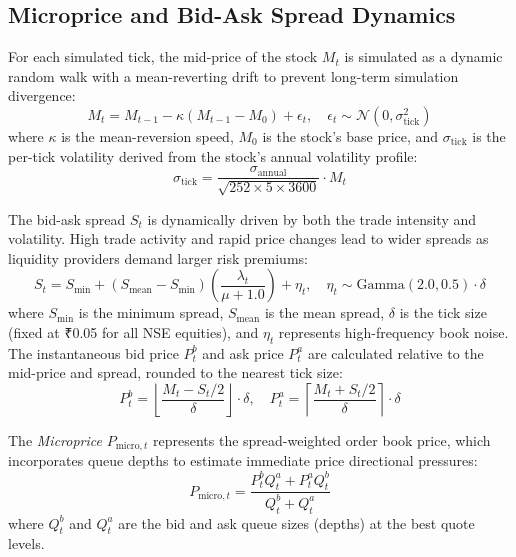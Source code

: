 \documentclass[11pt,a4paper]{article}
\begin{document}
\subsection{Microprice and Bid-Ask Spread Dynamics}
For each simulated tick, the mid-price of the stock $M_t$ is simulated as a dynamic random walk with a mean-reverting drift to prevent long-term simulation divergence:
\begin{equation}
    M_t = M_{t-1} - \kappa (M_{t-1} - M_0) + \epsilon_t, \quad \epsilon_t \sim \mathcal{N}(0, \sigma_{\text{tick}}^2)
\end{equation}
where $\kappa$ is the mean-reversion speed, $M_0$ is the stock's base price, and $\sigma_{\text{tick}}$ is the per-tick volatility derived from the stock's annual volatility profile:
\begin{equation}
    \sigma_{\text{tick}} = \frac{\sigma_{\text{annual}}}{\sqrt{252 \times 5 \times 3600}} \cdot M_t
\end{equation}

The bid-ask spread $S_t$ is dynamically driven by both the trade intensity and volatility. High trade activity and rapid price changes lead to wider spreads as liquidity providers demand larger risk premiums:
\begin{equation}
    S_t = S_{\text{min}} + (S_{\text{mean}} - S_{\text{min}}) \left(\frac{\lambda_t}{\mu + 1.0}\right) + \eta_t, \quad \eta_t \sim \text{Gamma}(2.0, 0.5) \cdot \delta
\end{equation}
where $S_{\text{min}}$ is the minimum spread, $S_{\text{mean}}$ is the mean spread, $\delta$ is the tick size (fixed at ₹0.05 for all NSE equities), and $\eta_t$ represents high-frequency book noise. The instantaneous bid price $P_t^b$ and ask price $P_t^a$ are calculated relative to the mid-price and spread, rounded to the nearest tick size:
\begin{equation}
    P_t^b = \left\lfloor \frac{M_t - S_t/2}{\delta} \right\rfloor \cdot \delta, \quad P_t^a = \left\lceil \frac{M_t + S_t/2}{\delta} \right\rceil \cdot \delta
\end{equation}

The \textit{Microprice} $P_{\text{micro}, t}$ represents the spread-weighted order book price, which incorporates queue depths to estimate immediate price directional pressures:
\begin{equation}
    P_{\text{micro}, t} = \frac{P_t^b Q_t^a + P_t^a Q_t^b}{Q_t^b + Q_t^a}
\end{equation}
where $Q_t^b$ and $Q_t^a$ are the bid and ask queue sizes (depths) at the best quote levels.
\end{document}
